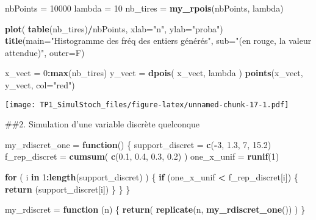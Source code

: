\documentclass[]{article}
\newenvironment{Shaded}{\begin{snugshade}}{\end{snugshade}}
\newcommand{\ControlFlowTok}[1]{\textcolor[rgb]{0.13,0.29,0.53}{\textbf{#1}}}
\newcommand{\DataTypeTok}[1]{\textcolor[rgb]{0.13,0.29,0.53}{#1}}
\newcommand{\DecValTok}[1]{\textcolor[rgb]{0.00,0.00,0.81}{#1}}
\newcommand{\FloatTok}[1]{\textcolor[rgb]{0.00,0.00,0.81}{#1}}
\newcommand{\KeywordTok}[1]{\textcolor[rgb]{0.13,0.29,0.53}{\textbf{#1}}}
\newcommand{\NormalTok}[1]{#1}
\newcommand{\OperatorTok}[1]{\textcolor[rgb]{0.81,0.36,0.00}{\textbf{#1}}}
\newcommand{\StringTok}[1]{\textcolor[rgb]{0.31,0.60,0.02}{#1}}
\begin{document}
\begin{Shaded}
\begin{Highlighting}[]
\NormalTok{nbPoints =}\StringTok{ }\DecValTok{10000}
\NormalTok{lambda =}\StringTok{ }\DecValTok{10}
\NormalTok{nb_tires =}\StringTok{ }\KeywordTok{my_rpois}\NormalTok{(nbPoints, lambda)}

\KeywordTok{plot}\NormalTok{( }\KeywordTok{table}\NormalTok{(nb_tires)}\OperatorTok{/}\NormalTok{nbPoints, }\DataTypeTok{xlab=}\StringTok{"n"}\NormalTok{, }\DataTypeTok{ylab=}\StringTok{"proba"}\NormalTok{)}
\KeywordTok{title}\NormalTok{(}\DataTypeTok{main=}\StringTok{"Histogramme des fréq des entiers générés"}\NormalTok{,}
      \DataTypeTok{sub=}\StringTok{"(en rouge, la valeur attendue)"}\NormalTok{, }\DataTypeTok{outer=}\NormalTok{F)}

\NormalTok{x_vect =}\StringTok{ }\DecValTok{0}\OperatorTok{:}\KeywordTok{max}\NormalTok{(nb_tires)}
\NormalTok{y_vect =}\StringTok{ }\KeywordTok{dpois}\NormalTok{( x_vect, lambda )}
\KeywordTok{points}\NormalTok{(x_vect, y_vect, }\DataTypeTok{col=}\StringTok{"red"}\NormalTok{)}
\end{Highlighting}
\end{Shaded}

\texttt{[image: TP1\_SimulStoch\_files/figure-latex/unnamed-chunk-17-1.pdf]}

\#\#2. Simulation d'une variable discrète quelconque

\begin{Shaded}
\begin{Highlighting}[]
\NormalTok{my_rdiscret_one =}\StringTok{ }\ControlFlowTok{function}\NormalTok{()}
\NormalTok{\{}
\NormalTok{  support_discret =}\StringTok{ }\KeywordTok{c}\NormalTok{(}\OperatorTok{-}\DecValTok{3}\NormalTok{, }\FloatTok{1.3}\NormalTok{, }\DecValTok{7}\NormalTok{, }\FloatTok{15.2}\NormalTok{)}
\NormalTok{  f_rep_discret =}\StringTok{ }\KeywordTok{cumsum}\NormalTok{( }\KeywordTok{c}\NormalTok{(}\FloatTok{0.1}\NormalTok{, }\FloatTok{0.4}\NormalTok{, }\FloatTok{0.3}\NormalTok{, }\FloatTok{0.2}\NormalTok{) )}
\NormalTok{  one_x_unif =}\StringTok{ }\KeywordTok{runif}\NormalTok{(}\DecValTok{1}\NormalTok{)}
  
  \ControlFlowTok{for}\NormalTok{ ( i }\ControlFlowTok{in} \DecValTok{1}\OperatorTok{:}\KeywordTok{length}\NormalTok{(support_discret) )}
\NormalTok{  \{}
    \ControlFlowTok{if}\NormalTok{ (one_x_unif }\OperatorTok{<}\StringTok{ }\NormalTok{f_rep_discret[i]) \{ }\KeywordTok{return}\NormalTok{ (support_discret[i]) \}}
\NormalTok{  \}}
\NormalTok{\}}


\NormalTok{my_rdiscret =}\StringTok{ }\ControlFlowTok{function}\NormalTok{ (n)}
\NormalTok{\{}
  \KeywordTok{return}\NormalTok{( }\KeywordTok{replicate}\NormalTok{(n, }\KeywordTok{my_rdiscret_one}\NormalTok{()) )}
\NormalTok{\}}
\end{Highlighting}
\end{Shaded}
\end{document}
